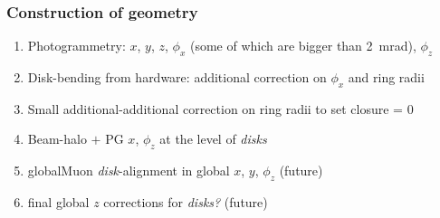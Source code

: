 \documentclass[compress]{beamer}
\begin{document}
\begin{frame}
\frametitle{Construction of geometry}
\begin{enumerate}
\item Photogrammetry: $x$, $y$, $z$, $\phi_x$ (some of which are bigger than 2~mrad), $\phi_z$
\item Disk-bending from hardware: additional correction on $\phi_x$ and ring radii
\item Small additional-additional correction on ring radii to set closure = 0
\item Beam-halo $+$ PG $x$, $\phi_z$ at the level of {\it disks}
\item globalMuon {\it disk}-alignment in global $x$, $y$, $\phi_z$ (future)
\item final global $z$ corrections for {\it disks?} (future)
\end{enumerate}

\end{frame}
\end{document}
